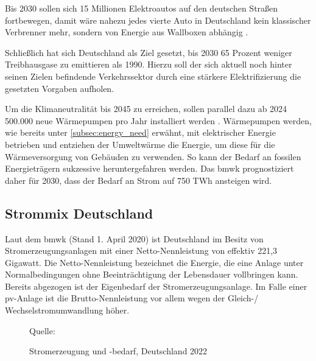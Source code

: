 \documentclass[12pt, a4paper]{article}
\begin{document}

Bis 2030 sollen sich 15 Millionen Elektroautos auf den deutschen Straßen fortbewegen, damit wäre nahezu jedes vierte Auto in Deutschland kein klassischer Verbrenner mehr, sondern von Energie aus Wallboxen abhängig \cite{ws:tagesschau}.


Schließlich hat sich Deutschland als Ziel gesetzt, bis 2030 65 Prozent weniger Treibhausgase zu emittieren als 1990. Hierzu soll der sich aktuell noch hinter seinen Zielen befindende Verkehrssektor durch eine stärkere Elektrifizierung die gesetzten Vorgaben aufholen.

Um die Klimaneutralität bis 2045 zu erreichen, sollen parallel dazu ab 2024 500.000 neue Wärmepumpen pro Jahr installiert werden \cite{ws:bundesregierung}. Wärmepumpen werden, wie bereits unter \autoref{subsec:energy_need} erwähnt, mit elektrischer Energie betrieben und entziehen der Umweltwärme die Energie, um diese für die Wärmeversorgung von Gebäuden zu verwenden. So kann der Bedarf an fossilen Energieträgern sukzessive heruntergefahren werden. Das \ac{bmwk} prognostiziert daher für 2030, dass der Bedarf an Strom auf 750 TWh ansteigen wird.

\subsection{Strommix Deutschland}

Laut dem \ac{bmwk} (Stand 1. April 2020) ist Deutschland im Besitz von Stromerzeugungsanlagen mit einer Netto-Nennleistung von effektiv 221,3 Gigawatt. Die Netto-Nennleistung bezeichnet die Energie, die eine Anlage unter Normalbedingungen ohne Beeinträchtigung der Lebensdauer vollbringen kann. Bereits abgezogen ist der Eigenbedarf der Stromerzeugungsanlage. Im Falle einer \ac{pv}-Anlage ist die Brutto-Nennleistung vor allem wegen der Gleich-/ Wechselstromumwandlung höher. 

\begin{figure}
\centering
\def\svgwidth{450pt}
\fontsize{7}{10}\selectfont

\captionsetup{justification=raggedleft,singlelinecheck=false,skip=0pt}\caption*{\scriptsize{Quelle: \cite{ws:smard}}}
\captionsetup{justification=centering,singlelinecheck=false,skip=25pt}
\caption{Stromerzeugung und -bedarf, Deutschland 2022}
\label{fig:stromerzeugung_de_2022}
\end {figure}
\end{document}
